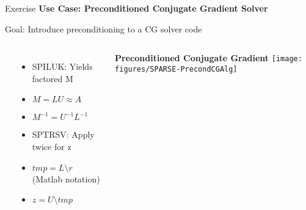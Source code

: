\begin{frame}[fragile]{Exercise}
\textbf{Use Case: Preconditioned Conjugate Gradient Solver}

Goal: Introduce preconditioning to a CG solver code

  \begin{columns}[t,onlytextwidth]
      \vspace{1em}
      \\
      \begin{itemize}
      \item SPILUK: Yields factored M
      \item $M = LU \approx A$
      \item $M^{-1} = U^{-1}L^{-1}$
      \vspace{2em}
      \item SPTRSV: Apply twice for z
      \item $tmp = L \setminus r$ (Matlab notation)
      \item $z = U \setminus tmp$
      \end{itemize}
      \vspace{-2em}
      \begin{center}
      \textbf{\tiny{Preconditioned Conjugate Gradient}}
      \texttt{[image: figures/SPARSE-PrecondCGAlg]}
      \vspace{-2em}
      \end{center}
  \end{columns}
\end{frame}

